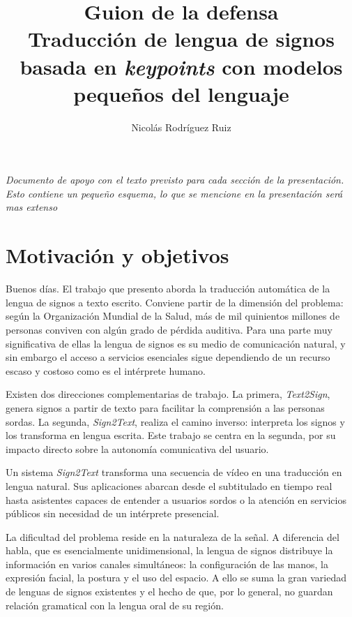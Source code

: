 \documentclass[11pt]{article}
\title{Guion de la defensa\\\large Traducción de lengua de signos basada en \textit{keypoints} con modelos pequeños del lenguaje}
\author{Nicolás Rodríguez Ruiz}
\date{}
\begin{document}
\maketitle

\noindent\textit{Documento de apoyo con el texto previsto para cada sección de la presentación. Esto contiene un pequeño esquema, lo que se mencione en la presentación será mas extenso}

\vspace{1em}

\section{Motivación y objetivos}

Buenos días. El trabajo que presento aborda la traducción automática de la lengua de signos a texto escrito. Conviene partir de la dimensión del problema: según la Organización Mundial de la Salud, más de mil quinientos millones de personas conviven con algún grado de pérdida auditiva. Para una parte muy significativa de ellas la lengua de signos es su medio de comunicación natural, y sin embargo el acceso a servicios esenciales sigue dependiendo de un recurso escaso y costoso como es el intérprete humano.

Existen dos direcciones complementarias de trabajo. La primera, \textit{Text2Sign}, genera signos a partir de texto para facilitar la comprensión a las personas sordas. La segunda, \textit{Sign2Text}, realiza el camino inverso: interpreta los signos y los transforma en lengua escrita. Este trabajo se centra en la segunda, por su impacto directo sobre la autonomía comunicativa del usuario.

Un sistema \textit{Sign2Text} transforma una secuencia de vídeo en una traducción en lengua natural. Sus aplicaciones abarcan desde el subtitulado en tiempo real hasta asistentes capaces de entender a usuarios sordos o la atención en servicios públicos sin necesidad de un intérprete presencial.

La dificultad del problema reside en la naturaleza de la señal. A diferencia del habla, que es esencialmente unidimensional, la lengua de signos distribuye la información en varios canales simultáneos: la configuración de las manos, la expresión facial, la postura y el uso del espacio. A ello se suma la gran variedad de lenguas de signos existentes y el hecho de que, por lo general, no guardan relación gramatical con la lengua oral de su región.
\end{document}
